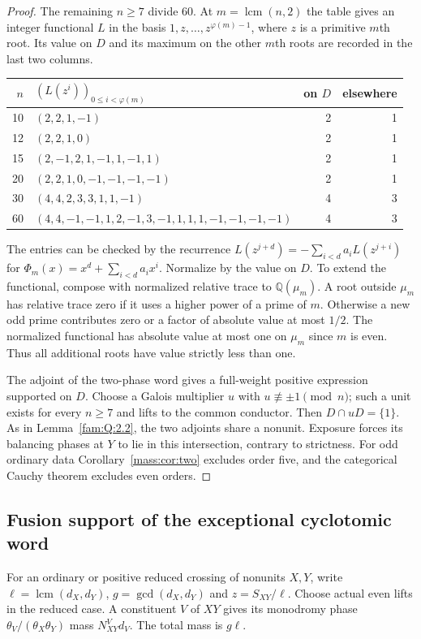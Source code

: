 \documentclass[11pt,a4paper]{article}
\numberwithin{equation}{section}
\theoremstyle{remark}
\newcommand{\QQ}{\mathbb Q}
\newcommand{\lcm}{\operatorname{lcm}}
\begin{document}
\begin{proof}
The remaining $n\ge7$ divide $60$. At $m=\lcm(n,2)$ the table gives
an integer functional $L$ in the basis $1,z,\ldots,z^{\varphi(m)-1}$,
where $z$ is a primitive $m$th root. Its value on $D$ and its maximum
on the other $m$th roots are recorded in the last two columns.
\begin{center}\small
\begin{tabular}{r@{\quad}lrr}\toprule
$n$ & $(L(z^i))_{0\le i<\varphi(m)}$ & on $D$ & elsewhere\\\midrule
10 & $(2,2,1,-1)$ & 2&1\\
12 & $(2,2,1,0)$ & 2&1\\
15 & $(2,-1,2,1,-1,1,-1,1)$ & 2&1\\
20 & $(2,2,1,0,-1,-1,-1,-1)$ & 2&1\\
30 & $(4,4,2,3,3,1,1,-1)$ & 4&3\\
60 & $(4,4,-1,-1,1,2,-1,3,-1,1,1,1,-1,-1,-1,-1)$ & 4&3\\\bottomrule
\end{tabular}\end{center}
The entries can be checked by the recurrence
$L(z^{j+d})=-\sum_{i<d} a_iL(z^{j+i})$ for
$\Phi_m(x)=x^d+\sum_{i<d}a_i x^i$.
Normalize by the value on $D$. To extend the functional, compose
with normalized relative trace to $\QQ(\mu_m)$. A root outside $\mu_m$
has relative trace zero if it uses a higher power of a prime of $m$.
Otherwise a new odd prime contributes zero or a factor of absolute
value at most $1/2$. The normalized functional has absolute value
at most one on $\mu_m$ since $m$ is even. Thus all additional roots
have value strictly less than one.

The adjoint of the two-phase word gives a full-weight positive
expression supported on $D$. Choose a Galois multiplier $u$ with
$u\not\equiv\pm1\pmod n$; such a unit exists for every $n\ge7$ and
lifts to the common conductor. Then $D\cap uD=\{1\}$. As in Lemma~\ref{fam:Q:2.2}, the two adjoints share a nonunit.
Exposure forces its balancing phases at $Y$ to lie in this intersection,
contrary to strictness. For odd ordinary data Corollary~\ref{mass:cor:two} excludes
order five, and the categorical Cauchy theorem excludes even orders.
\end{proof}

\subsection{Fusion support of the exceptional cyclotomic word}\label{found:S:5}
For an ordinary or positive reduced crossing of nonunits $X,Y$, write
$\ell=\lcm(d_X,d_Y)$, $g=\gcd(d_X,d_Y)$ and $z=S_{XY}/\ell$.
Choose actual even lifts in the reduced case.
A constituent $V$ of $XY$ gives its monodromy phase
$\theta_V/(\theta_X\theta_Y)$ mass $N^V_{XY}d_V$.
The total mass is $g\ell$.
\end{document}
